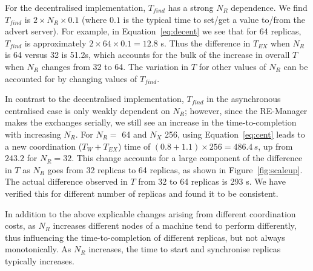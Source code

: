 \documentclass{rspublic}
\newcommand{\jhanote}[1]{ {\textcolor{red} { ***shantenu: #1 }}}
\newcommand{\alnote}[1]{ {\textcolor{blue} { ***andre: #1 }}}
\newcommand{\athotanote}[1]{ {\textcolor{green} { ***athota: #1 }}}
\newcommand{\alnote}[1]{}
\newcommand{\athotanote}[1]{}
\newcommand{\jhanote}[1]{}
\begin{document}
For the decentralised implementation, $T_{find}$ has a strong $N_R$
dependence. We find $T_{find}$ is $2 \times N_R \times 0.1$ (where $0.1$ is
the typical time to set/get a value to/from the advert server).  For
example, in Equation~\ref{eq:decent} we see that for 64 replicas,
$T_{find}$ is approximately $2 \times 64 \times 0.1 = 12.8$ s.  Thus the
difference in $T_{EX}$ when $N_R$ is 64 versus 32 is 51.2s, which
accounts for the bulk of the increase in overall $T$ when $N_R$
changes from 32 to 64. %
The variation in $T$ for other values of $N_R$ can be
accounted for by changing values of $T_{find}$.



In contrast to the decentralised implementation, $T_{find}$ in the
asynchronous centralised case is only weakly dependent on $N_R$; however,
since the RE-Manager makes the exchanges serially, we still see an
increase in the time-to-completion with increasing $N_R$. %
For $N_R =$ 64 and $N_X$ 256, using Equation~\ref{eq:cent} leads to a
new coordination ($T_W + T_{EX}$) time of $(0.8+1.1) \times 256 =
486.4\,s$, up from $243.2$ for $N_R = 32$. This change accounts for a
large component of the difference in $T$ as $N_R$ goes from 32
replicas to 64 replicas, as shown in Figure~\ref{fig:scaleup}. The
actual difference observed in $T$ from 32 to 64 replicas is 293
s. %
We have verified this for different number of replicas and found it to
be consistent.

In addition to the above explicable changes arising from different
coordination costs, as $N_R$ increases different nodes of a machine
tend to perform differently, thus influencing the time-to-completion
of different replicas, but not always monotonically.  %
As $N_R$ increases, the time to start and synchronise replicas
typically increases.

\end{document}
